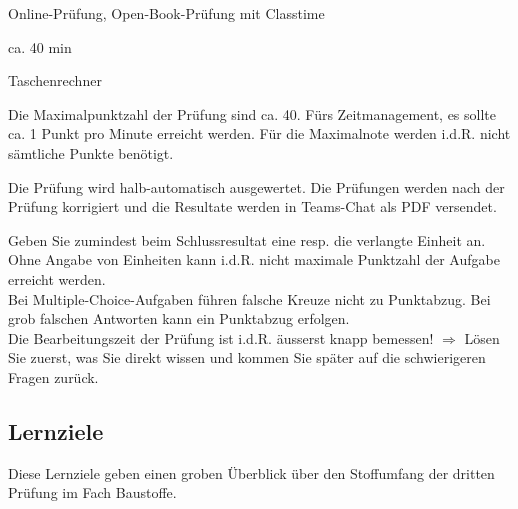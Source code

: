 \begin{description}[leftmargin=!,labelwidth=\widthof{Hinweise zur Bearbeitung...},font=\normalfont]
\item [Prüfungsmodus] Online-Prüfung, Open-Book-Prüfung mit Classtime
\item  [Prüfungsdauer] ca. 40 min
\item [Empfohlene Hilfsmittel] Taschenrechner
\item [Anzahl Punkte] Die Maximalpunktzahl der Prüfung sind ca. 40.  Fürs Zeitmanagement, es sollte ca. 1 Punkt pro Minute erreicht werden. Für die Maximalnote werden i.d.R. nicht sämtliche Punkte benötigt.
\item [Bewertung] Die Prüfung wird halb-automatisch ausgewertet. Die Prüfungen werden nach der Prüfung korrigiert und die Resultate werden in Teams-Chat als PDF versendet.
\item [Hinweise zur Bearbeitung] Geben Sie zumindest beim Schlussresultat eine resp. die verlangte Einheit an. Ohne Angabe von Einheiten kann i.d.R. nicht maximale Punktzahl der Aufgabe erreicht werden. \\ Bei Multiple-Choice-Aufgaben führen falsche Kreuze nicht zu Punktabzug. Bei grob falschen Antworten kann ein Punktabzug erfolgen. \\ Die Bearbeitungszeit der Prüfung ist i.d.R. äusserst knapp bemessen! $\Rightarrow$ Lösen Sie zuerst, was Sie direkt wissen und kommen Sie später auf die schwierigeren Fragen zurück.
\end{description}


\pagebreak
\subsection*{Lernziele}
Diese Lernziele geben einen groben Überblick über den Stoffumfang der dritten Prüfung im Fach Baustoffe.














